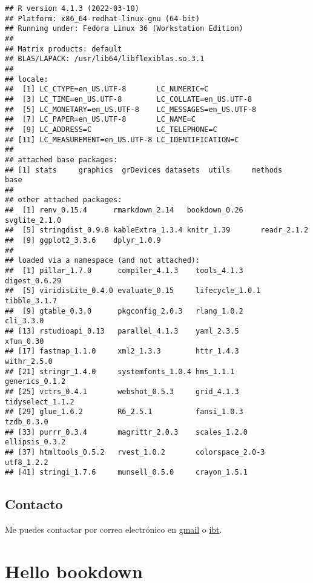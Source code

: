 \documentclass[
]{book}
\theoremstyle{definition}
\theoremstyle{definition}
\theoremstyle{definition}
\theoremstyle{definition}
\theoremstyle{remark}
\begin{document}
\begin{verbatim}
## R version 4.1.3 (2022-03-10)
## Platform: x86_64-redhat-linux-gnu (64-bit)
## Running under: Fedora Linux 36 (Workstation Edition)
## 
## Matrix products: default
## BLAS/LAPACK: /usr/lib64/libflexiblas.so.3.1
## 
## locale:
##  [1] LC_CTYPE=en_US.UTF-8       LC_NUMERIC=C              
##  [3] LC_TIME=en_US.UTF-8        LC_COLLATE=en_US.UTF-8    
##  [5] LC_MONETARY=en_US.UTF-8    LC_MESSAGES=en_US.UTF-8   
##  [7] LC_PAPER=en_US.UTF-8       LC_NAME=C                 
##  [9] LC_ADDRESS=C               LC_TELEPHONE=C            
## [11] LC_MEASUREMENT=en_US.UTF-8 LC_IDENTIFICATION=C       
## 
## attached base packages:
## [1] stats     graphics  grDevices datasets  utils     methods   base     
## 
## other attached packages:
##  [1] renv_0.15.4      rmarkdown_2.14   bookdown_0.26    svglite_2.1.0   
##  [5] stringdist_0.9.8 kableExtra_1.3.4 knitr_1.39       readr_2.1.2     
##  [9] ggplot2_3.3.6    dplyr_1.0.9     
## 
## loaded via a namespace (and not attached):
##  [1] pillar_1.7.0      compiler_4.1.3    tools_4.1.3       digest_0.6.29    
##  [5] viridisLite_0.4.0 evaluate_0.15     lifecycle_1.0.1   tibble_3.1.7     
##  [9] gtable_0.3.0      pkgconfig_2.0.3   rlang_1.0.2       cli_3.3.0        
## [13] rstudioapi_0.13   parallel_4.1.3    yaml_2.3.5        xfun_0.30        
## [17] fastmap_1.1.0     xml2_1.3.3        httr_1.4.3        withr_2.5.0      
## [21] stringr_1.4.0     systemfonts_1.0.4 hms_1.1.1         generics_0.1.2   
## [25] vctrs_0.4.1       webshot_0.5.3     grid_4.1.3        tidyselect_1.1.2 
## [29] glue_1.6.2        R6_2.5.1          fansi_1.0.3       tzdb_0.3.0       
## [33] purrr_0.3.4       magrittr_2.0.3    scales_1.2.0      ellipsis_0.3.2   
## [37] htmltools_0.5.2   rvest_1.0.2       colorspace_2.0-3  utf8_1.2.2       
## [41] stringi_1.7.6     munsell_0.5.0     crayon_1.5.1
\end{verbatim}

\hypertarget{contacto}{%
\section{Contacto}\label{contacto}}

Me puedes contactar por correo electrónico en \href{mailto:murpholinox@gmail.com}{gmail} o \href{mailto:francisco.murphy@ibt.unam.mx}{ibt}.

\hypertarget{hello-bookdown}{%
\chapter{Hello bookdown}\label{hello-bookdown}}
\end{document}

